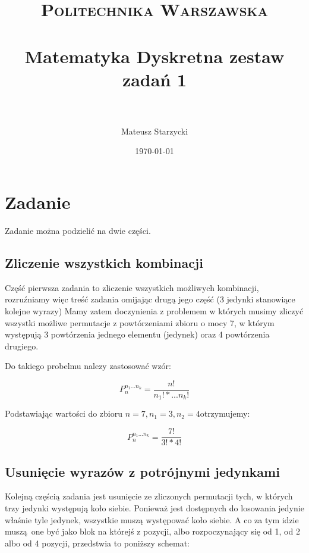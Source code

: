 \documentclass[paper=a4, fontsize=11pt]{scrartcl} %
\title{ 
    \normalfont \normalsize 
    \textsc{Politechnika Warszawska} \\ [25pt] %
    \horrule{0.5pt} \\[0.4cm] %
    \huge Matematyka Dyskretna zestaw zadań 1\\ %
    \horrule{2pt} \\[0.5cm] %
}
\author{Mateusz Starzycki} %
\date{\normalsize\today} %
\numberwithin{equation}{section} %
\numberwithin{figure}{section} %
\numberwithin{table}{section} %
\begin{document}
\maketitle %


\newpage

\section{Zadanie}

Zadanie można podzielić na dwie części.

\subsection{Zliczenie wszystkich kombinacji}

Część pierwsza zadania to zliczenie wszystkich możliwych kombinacji,
rozruźniamy więc treść zadania omijając drugą jego część (3 jedynki stanowiące kolejne wyrazy)
Mamy zatem doczynienia z problemem w których musimy zliczyć wszystki możliwe permutacje z powtórzeniami
zbioru o mocy 7, w którym występują 3 powtórzenia jednego elementu (jedynek) oraz 4 powtórzenia drugiego.

Do takiego probelmu nalezy zastosować wzór:

\begin{equation}
  P_n^{n_1...n_k} = \frac{n!}{n_1!*...n_k!}
\end{equation}

Podstawiając wartości do zbioru \(n = 7, n_1 = 3, n_2 = 4\)otrzymujemy:

\begin{equation}
  P_n^{n_1...n_k} = \frac{7!}{3!*4!}
\end{equation}

\subsection{Usunięcie wyrazów z potrójnymi jedynkami}

Kolejną częścią zadania jest usunięcie ze zliczonych permutacji tych, w których trzy jedynki występują koło siebie.
Ponieważ jest dostępnych do losowania jedynie właśnie tyle jedynek, wszystkie muszą występować koło siebie.
A co za tym idzie muszą one być jako blok na którejś z pozycji, albo rozpoczynający się od 1, od 2 albo od 4 pozycji,
przedstwia to poniższy schemat:
\end{document}
